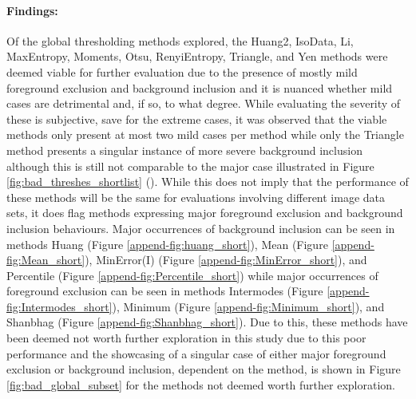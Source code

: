 \paragraph{Findings:} Of the global thresholding methods explored, the Huang2, IsoData, Li, MaxEntropy, Moments, Otsu, RenyiEntropy, Triangle, and Yen methods were deemed viable for further evaluation due to the presence of mostly mild foreground exclusion and background inclusion and it is nuanced whether mild cases are detrimental and, if so, to what degree. While evaluating the severity of these is subjective, save for the extreme cases, it was observed that the viable methods only present at most two mild cases per method while only the Triangle method presents a singular instance of more severe background inclusion although this is still not comparable to the major case illustrated in Figure \ref{fig:bad_threshes_shortlist} (). While this does not imply that the performance of these methods will be the same for evaluations involving different image data sets, it does flag methods expressing major foreground exclusion and background inclusion behaviours. Major occurrences of background inclusion can be seen in methods Huang (Figure \ref{append-fig:huang_short}), Mean (Figure \ref{append-fig:Mean_short}), MinError(I) (Figure \ref{append-fig:MinError_short}), and Percentile (Figure \ref{append-fig:Percentile_short}) while major occurrences of foreground exclusion can be seen in methods Intermodes (Figure \ref{append-fig:Intermodes_short}), Minimum (Figure \ref{append-fig:Minimum_short}), and Shanbhag (Figure \ref{append-fig:Shanbhag_short}). Due to this, these methods have been deemed not worth further exploration in this study due to this poor performance and the showcasing of a singular case of either major foreground exclusion or background inclusion, dependent on the method, is shown in Figure \ref{fig:bad_global_subset} for the methods not deemed worth further exploration. 


